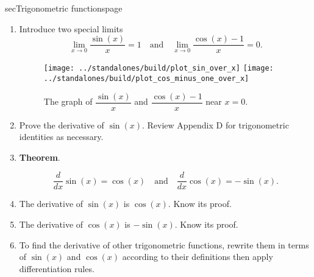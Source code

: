 \documentclass[../main]{subfiles}
\begin{document}
\begin{outline}{sec}{Trigonometric functions}{page} \label{act:trigs}
  \begin{enumerate}
    \item Introduce two special limits
      \[
        \lim_{x \to 0} \frac{\sin(x)}{x} = 1 \quad\text{and}\quad \lim_{x \to 0} \frac{\cos(x) - 1}{x} = 0.
      \]
      \begin{figure}[ht]
        \centering
        \texttt{[image: ../standalones/build/plot\_sin\_over\_x]}
        \texttt{[image: ../standalones/build/plot\_cos\_minus\_one\_over\_x]}
        \caption{The graph of \(\dfrac{\sin(x)}{x}\) and \(\dfrac{\cos(x) - 1}{x}\) near \(x=0\).}
      \end{figure}
      
    \item Prove the derivative of \(\sin(x)\). Review Appendix D for trigonometric identities as necessary.
    \item \textbf{Theorem}.
      \begin{mdframed}[style=simple]
        \[
          \frac{d}{dx} \sin(x) = \cos(x) 
          \quad\text{and}\quad
          \frac{d}{dx} \cos(x) = -\sin(x).
        \]
      \end{mdframed}
        

    \item {The derivative of \(\sin(x)\) is \(\cos(x)\). Know its proof.}
    \item {The derivative of \(\cos(x)\) is \(-\sin(x)\). Know its proof.}
    \item {To find the derivative of other trigonometric functions, rewrite them in terms of \(\sin(x)\) and \(\cos(x)\) according to their definitions then apply differentiation rules.}
\end{enumerate}
\end{outline}
\end{document}
